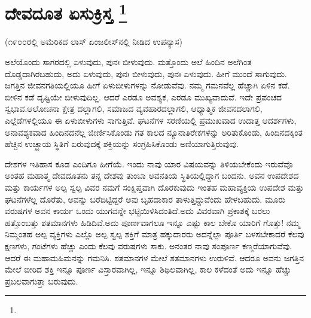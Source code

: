 
\chapter[ದೇವದೂತ ಏಸುಕ್ರಿಸ್ತ ]{ದೇವದೂತ ಏಸುಕ್ರಿಸ್ತ \protect\footnote{}}

(೧೯೦೦ರಲ್ಲಿ ಅಮೆರಿಕದ ಲಾಸ್​ ಏಂಜಲೀಸ್​ನಲ್ಲಿ ನೀಡಿದ ಉಪನ್ಯಾಸ)

ಅಲೆಯೊಂದು ಸಾಗರದಲ್ಲಿ ಏಳುವುದು, ಪುನಃ ಬೀಳುವುದು. ಮತ್ತೊಂದು ಅಲೆ ಹಿಂದಿನ ಅಲೆಗಿಂತ ದೊಡ್ಡದಾಗಿರಬಹುದು, ಅದು ಏಳುವುದು, ಪುನಃ ಬೀಳುವುದು, ಪುನಃ ಏಳುವುದು. ಹೀಗೆ ಮುಂದೆ ಸಾಗುವುದು. ಜಗತ್ತಿನ ಜೀವನಗತಿಯಲ್ಲಿಯೂ ಹೀಗೆ ಏಳುಬೀಳುಗಳನ್ನು ನೋಡುವೆವು. ನಮ್ಮ ಗಮನವೆಲ್ಲ ಹೆಚ್ಚಾಗಿ ಏಳಿನ ಕಡೆ. ಬೀಳಿನ ಕಡೆ ದೃಷ್ಟಿಯೇ ಬೀಳುವುದಿಲ್ಲ. ಆದರೆ ಎರಡೂ ಅವಶ್ಯಕ, ಎರಡೂ ಮುಖ್ಯವಾದುವೆ. ಇದೇ ಪ್ರಪಂಚದ ಸ್ವಭಾವ.ಆಲೋಚನಾ ಕ್ಷೇತ್ರ ದಲ್ಲಾಗಲಿ, ಸಮಾಜದ ವ್ಯವಹಾರದಲ್ಲಾಗಲಿ, ಆಧ್ಯಾತ್ಮಿಕ ಜೀವನದಲಾಗಲಿ, ಎಲ್ಲೆಡೆಗಳಲ್ಲಿಯೂ ಈ ಏಳುಬೀಳುಗಳು ಸಾಗುತ್ತಿವೆ. ಘಟನೆಗಳ ಸರಣಿಯಲ್ಲಿ ಪ್ರಮುಖವಾದ ಉದಾತ್ತ ಆದರ್ಶಗಳು, ಅನಾವಶ್ಯಕವಾದ ಹಿಂದಿನದನೆಲ್ಲ ಜೀರ್ಣಿಸಿಕೊಂಡು ಗತ ಕಾಲದ ನ್ಯೂನಾತಿರೇಕಗಳನ್ನು ಅರಿತುಕೊಂಡು, ಹಿಂದಿನದಕ್ಕಿಂತ ಹೆಚ್ಚಿನ ಉಚ್ಛ್ರಾಯ ಸ್ಥಿತಿಗೆ ಏರುವುದಕ್ಕೆ ಶಕ್ತಿಯನ್ನು ಸಂಗ್ರಹಿಸಿಕೊಂಡು ಅಣಿಯಾಗುತ್ತಿರುವುವು.

ದೇಶಗಳ ಇತಿಹಾಸ ಕೂಡ ಎಂದಿಗೂ ಹೀಗೆಯೆ. ಇಂದು ನಾವು ಯಾರ ವಿಷಯವನ್ನು ತಿಳಿಯಬೇಕೆಂದು ಇರುವೆವೊ ಅಂತಹ ಮಹಾತ್ಮ ದೇವದೂತನು ತನ್ನ ದೇಶವು ತುಂಬಾ ಅವನತಿಯ ಸ್ಥಿತಿಯಲ್ಲಿದ್ದಾಗ ಬಂದನು. ಅವನ ಉಪದೇಶದ ಮತ್ತು ಕಾರ್ಯಗಳ ಅಲ್ಪ ಸ್ವಲ್ಪ ವಿವರ ನಮಗೆ ಸಂಕ್ಷಿಪ್ತವಾಗಿ ದೊರಕುವುದು ಇಂತಹ ಮಹಾವ್ಯಕ್ತಿಯ ಉಪದೇಶ ಮತ್ತು ಘಟನೆಗಳೆಲ್ಲ ದೊರೆತು, ಅವನ್ನು ಬರೆದಿಟ್ಟಿದ್ದರೆ ಅವು ಬೃಹದಾಕಾರ ತಾಳುತ್ತಿದ್ದುವೆಂದು ಹೇಳಬಹುದು. ಮೂರು ವರುಷಗಳ ಅವನ ಕಾರ್ಯ ಒಂದು ಯುಗವನ್ನೇ ಭಟ್ಟಿಯಿಳಿಸಿದಂತಿದೆ.ಅದು ವಿವರವಾಗಿ ಪ್ರಕಾಶಕ್ಕೆ ಬರಲು ಹತ್ತೊಂಬತ್ತು ಶತಮಾನಗಳು ಹಿಡಿದಿವೆ.ಅದು ಪೂರ್ಣವಾಗಲೂ ಇನ್ನೂ ಎಷ್ಟು ಕಾಲ ಬೇಕೊ ಯಾರಿಗೆ ಗೊತ್ತು! ನಮ್ಮ ನಿಮ್ಮಂತಹ ಅಲ್ಪ ವ್ಯಕ್ತಿಗಳು ಎಲ್ಲೊ ಅಲ್ಪ ಸ್ವಲ್ಪ ಶಕ್ತಿಗೆ ಮಾತ್ರ ಹಕ್ಕುದಾರರು ಅದನ್ನೆಲ್ಲಾ ಪೂರ್ತಿ ಬಳಸಬೇಕಾದರೆ ಕೆಲವು ಕ್ಷಣಗಳು, ಗಂಟೆಗಳು ಹೆಚ್ಚು ಎಂದು ಕೆಲವು ವರುಷಗಳು ಸಾಕು. ಅನಂತರ ನಾವು ಸಂಪೂರ್ಣ ಕಣ್ಮರೆಯಾಗುವೆವು. ಆದರೆ ಈ ಮಹಾಮಹಿಮನನ್ನು ಗಮನಿಸಿ. ಶತಮಾನಗಳ ಮೇಲೆ ಶತಮಾನಗಳು ಉರುಳಿವೆ. ಆದರೂ ಅವನು ಜಗತ್ತಿನ ಮೇಲೆ ಬೀರಿದ ಶಕ್ತಿ ಇನ್ನೂ ಪೂರ್ಣ ವಿಸ್ತಾರವಾಗಿಲ್ಲ, ಇನ್ನೂ ಶಿಥಿಲವಾಗಿಲ್ಲ, ಕಾಲ ಕಳೆದಂತೆ ಅದು ಇನ್ನೂ ಹೆಚ್ಚು ಪ್ರಬಲವಾಗುತ್ತಾ ಬರುವುದು.


